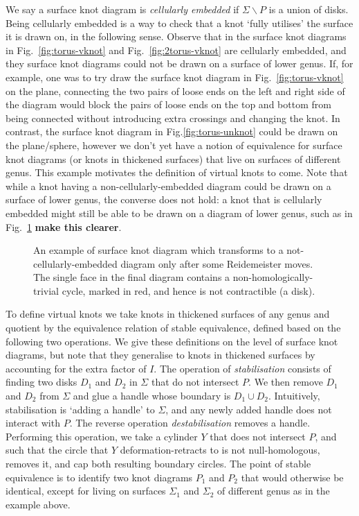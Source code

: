 \documentclass[12pt]{report}
\newcommand{\notered}[1]{{\color{Red} \textbf{#1}}}
\begin{document}
We say a surface knot diagram is \textit{cellularly embedded} if $\Sigma \smallsetminus P$ is a union of disks. Being cellularly embedded is a way to check that a knot `fully utilises' the surface it is drawn on, in the following sense. Observe that in the surface knot diagrams in Fig.~\ref{fig:torus-vknot} and Fig.~\ref{fig:2torus-vknot} are cellularly embedded, and they surface knot diagrams could not be drawn on a surface of lower genus. If, for example, one was to try draw the surface knot diagram in Fig.~\ref{fig:torus-vknot} on the plane, connecting the two pairs of loose ends on the left and right side of the diagram would block the pairs of loose ends on the top and bottom from being connected without introducing extra crossings and changing the knot. In contrast, the surface knot diagram in Fig.\ref{fig:torus-unknot} could be drawn on the plane/sphere, however we don't yet have a notion of equivalence for surface knot diagrams (or knots in thickened surfaces) that live on surfaces of different genus. This example motivates the definition of virtual knots to come. Note that while a knot having a non-cellularly-embedded diagram could be drawn on a surface of lower genus, the converse does not hold: a knot that is cellularly embedded might still be able to be drawn on a diagram of lower genus, such as in Fig.~\ref{fig:cellular-embedding-tricky} \notered{make this clearer}.

\begin{figure}[hbt!]
	\centering
	\def\svgscale{0.56}
	
	
	\caption{An example of surface knot diagram which transforms to a not-cellularly-embedded diagram only after some Reidemeister moves. The single face in the final diagram contains a non-homologically-trivial cycle, marked in red, and hence is not contractible (a disk).}
	\label{fig:cellular-embedding-tricky}
\end{figure}

To define virtual knots we take knots in thickened surfaces of any genus and quotient by the equivalence relation of stable equivalence, defined based on the following two operations. We give these definitions on the level of surface knot diagrams, but note that they generalise to knots in thickened surfaces by accounting for the extra factor of $I$. The operation of \textit{stabilisation} consists of finding two disks $D_{1}$ and $D_{2}$ in $\Sigma$ that do not intersect $P$. We then remove $D_{1}$ and $D_{2}$ from $\Sigma$ and glue a handle whose boundary is $D_{1} \cup D_{2}$. Intuitively, stabilisation is `adding a handle' to $\Sigma$, and any newly added handle does not interact with $P$. The reverse operation \textit{destabilisation} removes a handle. Performing this operation, we take a cylinder $Y$ that does not intersect $P$, and such that the circle that $Y$ deformation-retracts to is not null-homologous, removes it, and cap both resulting boundary circles. The point of stable equivalence is to identify two knot diagrams $P_{1}$ and $P_{2}$ that would otherwise be identical, except for living on surfaces $\Sigma_{1}$ and $\Sigma_{2}$ of different genus as in the example above.
\end{document}
